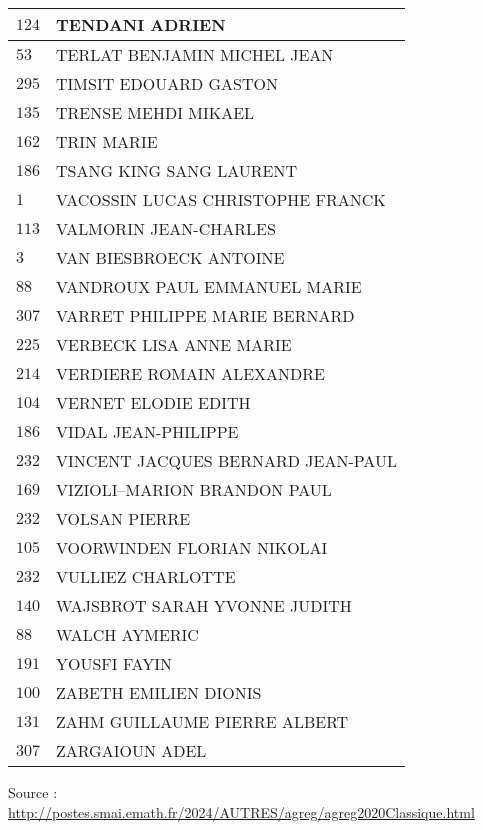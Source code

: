\begin{xltabular}{\linewidth}{|l|X|}
    \hline
    $124$ & TENDANI ADRIEN \\
    \hline
    $53$ & TERLAT BENJAMIN MICHEL JEAN \\
    \hline
    $295$ & TIMSIT EDOUARD GASTON \\
    \hline
    $135$ & TRENSE MEHDI MIKAEL \\
    \hline
    $162$ & TRIN MARIE \\
    \hline
    $186$ & TSANG KING SANG LAURENT \\
    \hline
    $1$ & VACOSSIN LUCAS CHRISTOPHE FRANCK \\
    \hline
    $113$ & VALMORIN JEAN-CHARLES \\
    \hline
    $3$ & VAN BIESBROECK ANTOINE \\
    \hline
    $88$ & VANDROUX PAUL EMMANUEL MARIE \\
    \hline
    $307$ & VARRET PHILIPPE MARIE BERNARD \\
    \hline
    $225$ & VERBECK LISA ANNE MARIE \\
    \hline
    $214$ & VERDIERE ROMAIN ALEXANDRE \\
    \hline
    $104$ & VERNET ELODIE EDITH \\
    \hline
    $186$ & VIDAL JEAN-PHILIPPE \\
    \hline
    $232$ & VINCENT JACQUES BERNARD JEAN-PAUL \\
    \hline
    $169$ & VIZIOLI--MARION BRANDON PAUL \\
    \hline
    $232$ & VOLSAN PIERRE \\
    \hline
    $105$ & VOORWINDEN FLORIAN NIKOLAI \\
    \hline
    $232$ & VULLIEZ CHARLOTTE \\
    \hline
    $140$ & WAJSBROT SARAH YVONNE JUDITH \\
    \hline
    $88$ & WALCH AYMERIC \\
    \hline
    $191$ & YOUSFI FAYIN \\
    \hline
    $100$ & ZABETH EMILIEN DIONIS \\
    \hline
    $131$ & ZAHM GUILLAUME PIERRE ALBERT \\
    \hline
    $307$ & ZARGAIOUN ADEL \\
    \hline
  \end{xltabular}

  \begin{flushright}
    {\tiny Source : \url{http://postes.smai.emath.fr/2024/AUTRES/agreg/agreg2020Classique.html}}
  \end{flushright}

